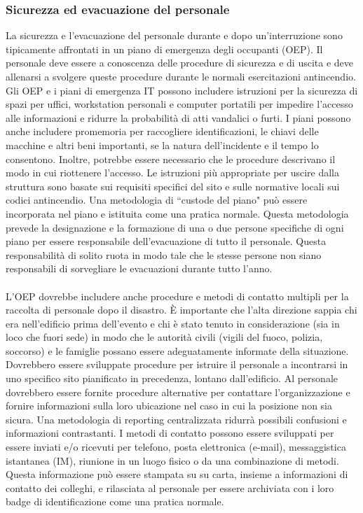 \documentclass[12pt, a4paper, titlepage]{report}
\begin{document}
			\subsubsection{Sicurezza ed evacuazione del personale}
				La sicurezza e l'evacuazione del personale durante e dopo un'interruzione sono tipicamente affrontati in un piano di emergenza degli occupanti (OEP). Il personale deve essere a conoscenza delle procedure di sicurezza e di uscita e deve allenarsi a svolgere queste procedure durante le normali esercitazioni antincendio. Gli OEP e i piani di emergenza IT possono includere istruzioni per la sicurezza di spazi per uffici, workstation personali e computer portatili per impedire l'accesso alle informazioni e ridurre la probabilità di atti vandalici o furti. I piani possono anche includere promemoria per raccogliere identificazioni, le chiavi delle macchine e altri beni importanti, se la natura dell'incidente e il tempo lo consentono. Inoltre, potrebbe essere necessario che le procedure descrivano il modo in cui riottenere l'accesso. Le istruzioni più appropriate per uscire dalla struttura sono basate sui requisiti specifici del sito e sulle normative locali sui codici antincendio. Una metodologia di ``custode del piano" può essere incorporata nel piano e istituita come una pratica normale. Questa metodologia prevede la designazione e la formazione di una o due persone specifiche di ogni piano per essere responsabile dell'evacuazione di tutto il personale. Questa responsabilità di solito ruota in modo tale che le stesse persone non siano responsabili di sorvegliare le evacuazioni durante tutto l'anno.\\
				\\L'OEP dovrebbe includere anche procedure e metodi di contatto multipli per la raccolta di personale dopo il disastro. È importante che l'alta direzione sappia chi era nell'edificio prima dell'evento e chi è stato tenuto in considerazione (sia in loco che fuori sede) in modo che le autorità civili (vigili del fuoco, polizia, soccorso) e le famiglie possano essere adeguatamente informate della situazione. Dovrebbero essere sviluppate procedure per istruire il personale a incontrarsi in uno specifico sito pianificato in precedenza, lontano dall'edificio. Al personale dovrebbero essere fornite procedure alternative per contattare l'organizzazione e fornire informazioni sulla loro ubicazione nel caso in cui la posizione non sia sicura. Una metodologia di reporting centralizzata ridurrà possibili confusioni e informazioni contrastanti. I metodi di contatto possono essere sviluppati per essere inviati e/o ricevuti per telefono, posta elettronica (e-mail), messaggistica istantanea (IM), riunione in un luogo fisico o da una combinazione di metodi. Questa informazione può essere stampata su su carta, insieme a informazioni di contatto dei colleghi, e rilasciata al personale per essere archiviata con i loro badge di identificazione come una pratica normale.
				
\end{document}
